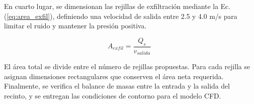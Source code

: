 En cuarto lugar, se dimensionan las rejillas de exfiltración mediante la Ec. (\ref{eq:area_exfil}), definiendo una velocidad de salida entre 2.5 y 4.0 m/s para limitar el ruido y mantener la presión positiva.

\begin{equation}
	A_{exfil} = \frac{Q_s}{v_{salida}}
	\label{eq:area_exfil}
\end{equation}

El área total se divide entre el número de rejillas propuestas. Para cada rejilla se asignan dimensiones rectangulares que conserven el área neta requerida. Finalmente, se verifica el balance de masas entre la entrada y la salida del recinto, y se entregan las condiciones de contorno para el modelo CFD.

